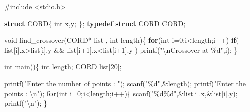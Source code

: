 \documentclass[
]{article}
\newenvironment{Shaded}{}{}
\newcommand{\ControlFlowTok}[1]{\textcolor[rgb]{0.00,0.44,0.13}{\textbf{#1}}}
\newcommand{\DataTypeTok}[1]{\textcolor[rgb]{0.56,0.13,0.00}{#1}}
\newcommand{\DecValTok}[1]{\textcolor[rgb]{0.25,0.63,0.44}{#1}}
\newcommand{\ImportTok}[1]{#1}
\newcommand{\KeywordTok}[1]{\textcolor[rgb]{0.00,0.44,0.13}{\textbf{#1}}}
\newcommand{\NormalTok}[1]{#1}
\newcommand{\OperatorTok}[1]{\textcolor[rgb]{0.40,0.40,0.40}{#1}}
\newcommand{\PreprocessorTok}[1]{\textcolor[rgb]{0.74,0.48,0.00}{#1}}
\newcommand{\SpecialCharTok}[1]{\textcolor[rgb]{0.25,0.44,0.63}{#1}}
\newcommand{\StringTok}[1]{\textcolor[rgb]{0.25,0.44,0.63}{#1}}
\begin{document}
\begin{Shaded}
\begin{Highlighting}[]
\PreprocessorTok{\#include }\ImportTok{\textless{}stdio.h\textgreater{}}

\KeywordTok{struct}\NormalTok{ CORD}\OperatorTok{\{}
        \DataTypeTok{int}\NormalTok{ x}\OperatorTok{,}\NormalTok{y}\OperatorTok{;}
\OperatorTok{\};}
\KeywordTok{typedef} \KeywordTok{struct}\NormalTok{ CORD CORD}\OperatorTok{;}

\DataTypeTok{void}\NormalTok{ find\_crossover}\OperatorTok{(}\NormalTok{CORD}\OperatorTok{*}\NormalTok{ list }\OperatorTok{,} \DataTypeTok{int}\NormalTok{ length}\OperatorTok{)\{}
        \ControlFlowTok{for}\OperatorTok{(}\DataTypeTok{int}\NormalTok{ i}\OperatorTok{=}\DecValTok{0}\OperatorTok{;}\NormalTok{i}\OperatorTok{\textless{}}\NormalTok{length}\OperatorTok{;}\NormalTok{i}\OperatorTok{++)}
                \ControlFlowTok{if}\OperatorTok{(}\NormalTok{ list}\OperatorTok{[}\NormalTok{i}\OperatorTok{].}\NormalTok{x}\OperatorTok{\textgreater{}}\NormalTok{list}\OperatorTok{[}\NormalTok{i}\OperatorTok{].}\NormalTok{y }\OperatorTok{\&\&}\NormalTok{ list}\OperatorTok{[}\NormalTok{i}\OperatorTok{+}\DecValTok{1}\OperatorTok{].}\NormalTok{x}\OperatorTok{\textless{}}\NormalTok{list}\OperatorTok{[}\NormalTok{i}\OperatorTok{+}\DecValTok{1}\OperatorTok{].}\NormalTok{y }\OperatorTok{)}
\NormalTok{                        printf}\OperatorTok{(}\StringTok{"}\SpecialCharTok{\textbackslash{}n}\StringTok{Crossover at \%d"}\OperatorTok{,}\NormalTok{i}\OperatorTok{);}
\OperatorTok{\}}

\DataTypeTok{int}\NormalTok{ main}\OperatorTok{()\{}
        \DataTypeTok{int}\NormalTok{ length}\OperatorTok{;}
\NormalTok{        CORD list}\OperatorTok{[}\DecValTok{20}\OperatorTok{];}

\NormalTok{        printf}\OperatorTok{(}\StringTok{"Enter the number of points : "}\OperatorTok{);}
\NormalTok{        scanf}\OperatorTok{(}\StringTok{"\%d"}\OperatorTok{,\&}\NormalTok{length}\OperatorTok{);}
\NormalTok{        printf}\OperatorTok{(}\StringTok{"Enter the points : }\SpecialCharTok{\textbackslash{}n}\StringTok{"}\OperatorTok{);}
        \ControlFlowTok{for}\OperatorTok{(}\DataTypeTok{int}\NormalTok{ i}\OperatorTok{=}\DecValTok{0}\OperatorTok{;}\NormalTok{i}\OperatorTok{\textless{}}\NormalTok{length}\OperatorTok{;}\NormalTok{i}\OperatorTok{++)\{}
\NormalTok{                scanf}\OperatorTok{(}\StringTok{"\%d\%d"}\OperatorTok{,\&}\NormalTok{list}\OperatorTok{[}\NormalTok{i}\OperatorTok{].}\NormalTok{x}\OperatorTok{,\&}\NormalTok{list}\OperatorTok{[}\NormalTok{i}\OperatorTok{].}\NormalTok{y}\OperatorTok{);}
\NormalTok{                printf}\OperatorTok{(}\StringTok{"}\SpecialCharTok{\textbackslash{}n}\StringTok{"}\OperatorTok{);}
        \OperatorTok{\}}


\end{Highlighting}
\end{Shaded}
\end{document}
